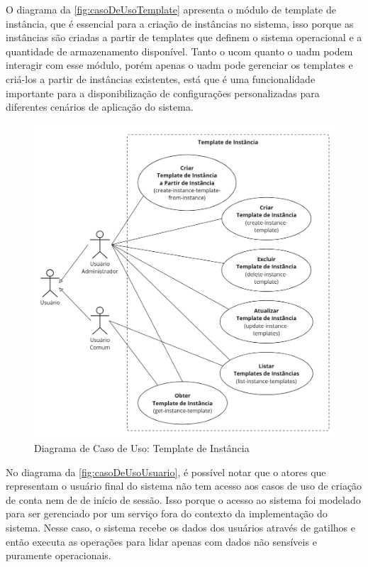 O diagrama da \autoref{fig:casoDeUsoTemplate} apresenta o módulo de template de instância, que é essencial para a criação de instâncias no sistema, isso porque as instâncias são criadas a partir de templates que definem o sistema operacional e a quantidade de armazenamento disponível. Tanto o \gls{ucom} quanto o \gls{uadm} podem interagir com esse módulo, porém apenas o \gls{uadm} pode gerenciar os templates e criá-los a partir de instâncias existentes, está que é uma funcionalidade importante para a disponibilização de configurações personalizadas para diferentes cenários de aplicação do sistema.

\begin{figure}[H]
\caption{Diagrama de Caso de Uso: Template de Instância}
\label{fig:casoDeUsoTemplate}
\includegraphics[width=\textwidth]{capitulos/2-metodologia/files/use-case-instance-template.png}
\end{figure}

No diagrama da \autoref{fig:casoDeUsoUsuario}, é possível notar que o atores que representam o usuário final do sistema não tem acesso aos casos de uso de criação de conta nem de de início de sessão. Isso porque o acesso ao sistema foi modelado para ser gerenciado por um serviço fora do contexto da implementação do sistema. Nesse caso, o sistema recebe os dados dos usuários através de gatilhos e então executa as operações para lidar apenas com dados não sensíveis e puramente operacionais.

